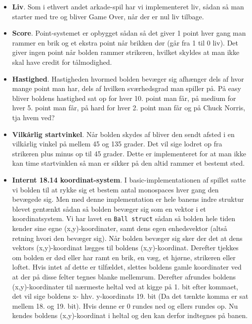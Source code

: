 \begin{itemize}
\item \textbf{Liv}. Som i ethvert andet arkade-spil har vi implementeret liv, sådan så man starter med tre og bliver Game Over, når der er nul liv tilbage.

\item \textbf{Score}. Point-systemet er opbygget sådan så det giver 1 point hver gang man rammer en brik og et ekstra point når brikken dør (går fra 1 til 0 liv). Det giver ingen point når bolden rammer strikeren, hvilket skyldes at man ikke skal have credit for tålmodighed.

\item \textbf{Hastighed}. Hastigheden hvormed bolden bevæger sig afhænger dels af hvor mange point man har, dels af hvilken sværhedsgrad man spiller på. På easy bliver boldens hastighed sat op for hver 10. point man får, på medium for hver 5. point man får, på hard for hver 2. point man får og på Chuck Norris, tja hvem ved?

\item \textbf{Vilkårlig startvinkel}. Når bolden skydes af bliver den sendt afsted i en vilkårlig vinkel på mellem 45 og 135 grader. Det vil sige lodret op fra strikeren plus minus op til 45 grader. Dette er implementeret for at man ikke kan time startvinklen så man er sikker på den altid rammer et bestemt sted.

\item \textbf{Internt 18.14 koordinat-system}. I basic-implementationen af spillet satte vi bolden til at rykke sig et bestem antal monospaces hver gang den bevægede sig. Men med denne implementation er hele banens indre struktur blevet gentænkt sådan så bolden bevæger sig som en vektor i et koordinatsystem. Vi har lavet en \texttt{Ball struct} sådan så bolden hele tiden kender sine egne (x,y)-koordinater, samt dens egen enhedsvektor (altså retning hvori den bevæger sig). Når bolden bevæger sig sker der det at dens vektors (x,y)-koordinat lægges til boldens (x,y)-koordinat. Derefter tjekkes om bolden er død eller har ramt en brik, en væg, et hjørne, strikeren eller loftet. Hvis intet af dette er tilfældet, slettes boldens gamle koordinater ved at der på disse felter tegnes blanke mellemrum. Derefter afrundes boldens (x,y)-koordinater til nærmeste heltal ved at kigge på 1. bit efter kommaet, det vil sige boldens x- hhv. y-koordinats 19. bit (Da det tænkte komma er sat mellem 18. og 19. bit). Hvis denne er 0 rundes ned og ellers rundes op. Nu kendes boldens (x,y)-koordinat i heltal og den kan derfor indtegnes på banen.


\end{itemize}
